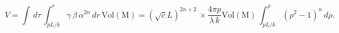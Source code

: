\begin{equation}
V= \int \,d\tau \,\int_{pL/k}^{r}\gamma \,\beta \,\alpha^{2n} \, dr \,
\mathrm{Vol(M)}=(\sqrt{c}L)^{2n+2}\,\times \frac{4\pi
p}{\lambda\,k}\mathrm{Vol(M)}\, \int_{pL/k}^{\rho} (\rho^2-1)^n\,
d\rho . \label{arbbolt}
\end{equation}

